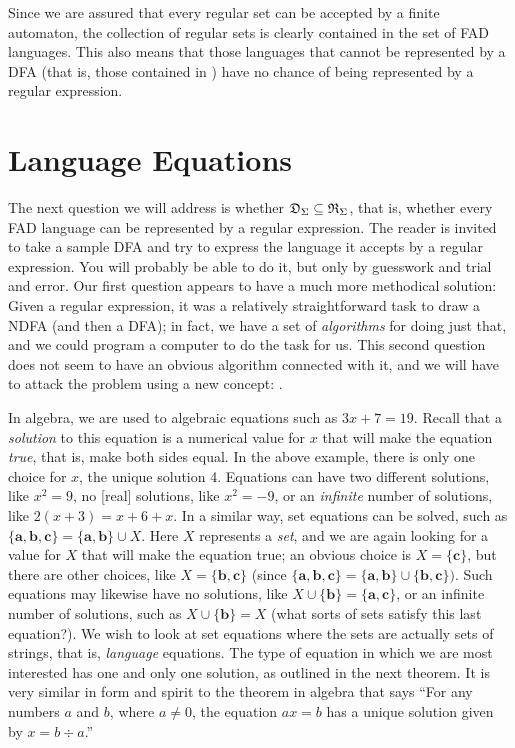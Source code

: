Since we are assured that every regular set can be accepted by a finite
automaton, the collection of regular sets is clearly contained in the set of FAD
languages. This also means that those languages that cannot be represented by a
DFA (that is, those contained in \NSIG) have no chance of being represented by a
regular expression.

\section{Language Equations}\label{sec-6.3}

The next question we will address is whether $\mathfrak{D}_\Sigma \subseteq \mathfrak{R}_\Sigma$, that is,
whether every FAD language can be represented by a regular expression. The
reader is invited to take a sample DFA and try to express the language it
accepts by a regular expression. You will probably be able to do it, but only by
guesswork and trial and error. Our first question appears to have a much more
methodical solution: Given a regular expression, it was a relatively
straightforward task to draw a NDFA (and then a DFA); in fact, we have a set of
\emph{algorithms} for doing just that, and we could program a computer to do the
task for us. This second question does not seem to have an obvious algorithm
connected with it, and we will have to attack the problem using a new concept:
\emph{}.

In algebra, we are used to algebraic equations such as $3x + 7 = 19$. Recall
that a \emph{solution} to this equation is a numerical value for $x$ that will make the
equation \emph{true}, that is, make both sides equal. In the above example, there is
only one choice for $x$, the unique solution 4. Equations can have two different
solutions, like $x^2=9$, no [real] solutions, like $x^2=-9$, or an \emph{infinite}
number of solutions, like $2(x+3) = x + 6 + x$. In a similar way, set equations
can be solved, such as $\{\pmb{a},\pmb{b},\pmb{c}\}=\{\pmb{a},\pmb{b}\}\cup X$.
Here $X$ represents a \emph{set}, and we are again looking for a value for $X$ that
will make the equation true; an obvious choice is $X=\{\pmb{c}\}$, but there are
other choices, like $X=\{\pmb{b},\pmb{c}\}$ (since $\{\pmb{a},\pmb{b},\pmb{c}\}=
\{\pmb{a},\pmb{b}\}\cup\{\pmb{b},\pmb{c}\})$. Such equations may likewise have
no solutions, like $X\cup\{\pmb{b}\}=\{\pmb{a},\pmb{c}\}$, or an infinite number
of solutions, such as $X\cup\{\pmb{b}\}=X$ (what sorts of sets satisfy this last
equation?). We wish to look at set equations where the sets are actually sets of
strings, that is, \emph{language} equations. The type of equation in which we
are most interested has one and only one solution, as outlined in the next
theorem. It is very similar in form and spirit to the theorem in algebra that
says ``For any numbers $a$ and $b$, where $a \not= 0$, the equation $ax=b$ has a
unique solution given by $x=b \div a$.''

